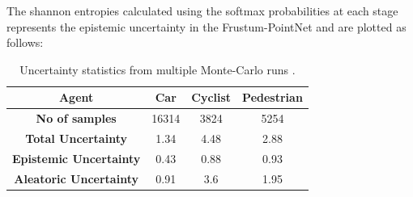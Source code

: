 \documentclass[10pt,twocolumn,letterpaper]{article}
\begin{document}
The shannon entropies calculated using the softmax probabilities at each stage represents the epistemic uncertainty in the Frustum-PointNet and are plotted as follows: 
\begin{table}[!htbp]
    \centering
    \begin{tabular}{|c|c|c|c|}
        \hline \textbf{Agent} & \textbf{Car} & \textbf{Cyclist} & \textbf{Pedestrian}  \\
        \hline \textbf{No of samples} & 16314 & 3824 & 5254 \\
        \hline \textbf{Total Uncertainty} & 1.34  & 4.48 & 2.88 \\
        \hline \textbf{Epistemic Uncertainty} & 0.43 & 0.88 & 0.93 \\
        \hline \textbf{Aleatoric Uncertainty} & 0.91 & 3.6 & 1.95 \\
        \hline
    \end{tabular}
	\label{UQ_Quant}	
	\caption{Uncertainty statistics from multiple Monte-Carlo runs \label{tab:Uncertianty Statistics}.}
\end{table}
\end{document}
